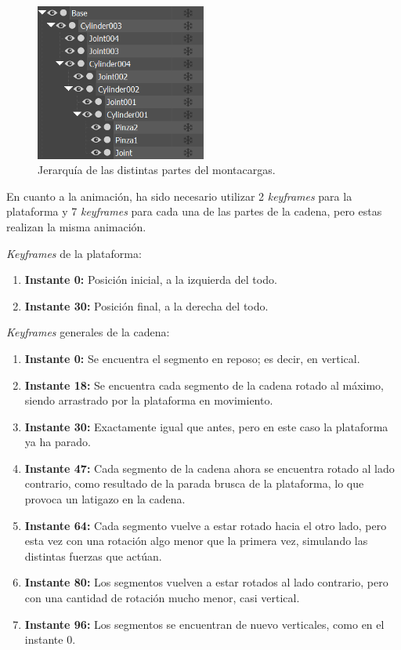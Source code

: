 \documentclass{article}
\begin{document}
\begin{figure}[H]
    \centering
    \includegraphics[width=0.5\textwidth]{imagenes/Ejercicio4/jerarquia.png}
    \caption{Jerarquía de las distintas partes del montacargas.}
\end{figure}

En cuanto a la animación, ha sido necesario utilizar 2 \textit{keyframes} para la plataforma y 7 \textit{keyframes} para cada una de las partes de la cadena, pero estas realizan la misma animación.

\bigskip

\textit{Keyframes} de la plataforma:

\begin{enumerate}
    \item \textbf{Instante 0:} Posición inicial, a la izquierda del todo.
    \item \textbf{Instante 30:} Posición final, a la derecha del todo.
\end{enumerate}

\bigskip

\textit{Keyframes} generales de la cadena:

\begin{enumerate}
    \item \textbf{Instante 0:} Se encuentra el segmento en reposo; es decir, en vertical.
    \item \textbf{Instante 18:} Se encuentra cada segmento de la cadena rotado al máximo, siendo arrastrado por la plataforma en movimiento.
    \item \textbf{Instante 30:} Exactamente igual que antes, pero en este caso la plataforma ya ha parado.
    \item \textbf{Instante 47:} Cada segmento de la cadena ahora se encuentra rotado al lado contrario, como resultado de la parada brusca de la plataforma, lo que provoca un latigazo en la cadena.
    \item \textbf{Instante 64:} Cada segmento vuelve a estar rotado hacia el otro lado, pero esta vez con una rotación algo menor que la primera vez, simulando las distintas fuerzas que actúan.
    \item \textbf{Instante 80:} Los segmentos vuelven a estar rotados al lado contrario, pero con una cantidad de rotación mucho menor, casi vertical.
    \item \textbf{Instante 96:} Los segmentos se encuentran de nuevo verticales, como en el instante 0.
\end{enumerate}
\bigskip
\end{document}
